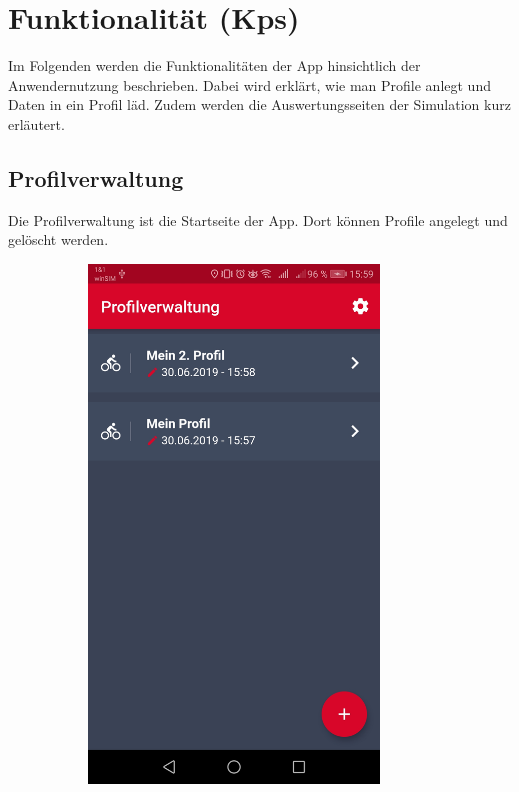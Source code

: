 \chapter{Funktionalität (Kps)}
\label{chap:funk}
Im Folgenden werden die Funktionalitäten der App hinsichtlich der Anwendernutzung beschrieben. Dabei wird erklärt, wie man Profile anlegt und Daten in ein Profil läd. Zudem werden die Auswertungsseiten der Simulation kurz erläutert. 
	\section{Profilverwaltung}
	\label{sec:profile}
	
	Die Profilverwaltung ist die Startseite der App. Dort können Profile angelegt und gelöscht werden.	
	
	\begin{figure}[H]
		\centering
		\begin{subfigure}[b]{0.45\textwidth}
			\centering
			\includegraphics[width=0.85\textwidth]{../include/images/funktionalitaet/profil}

\end{subfigure}
\end{figure}
